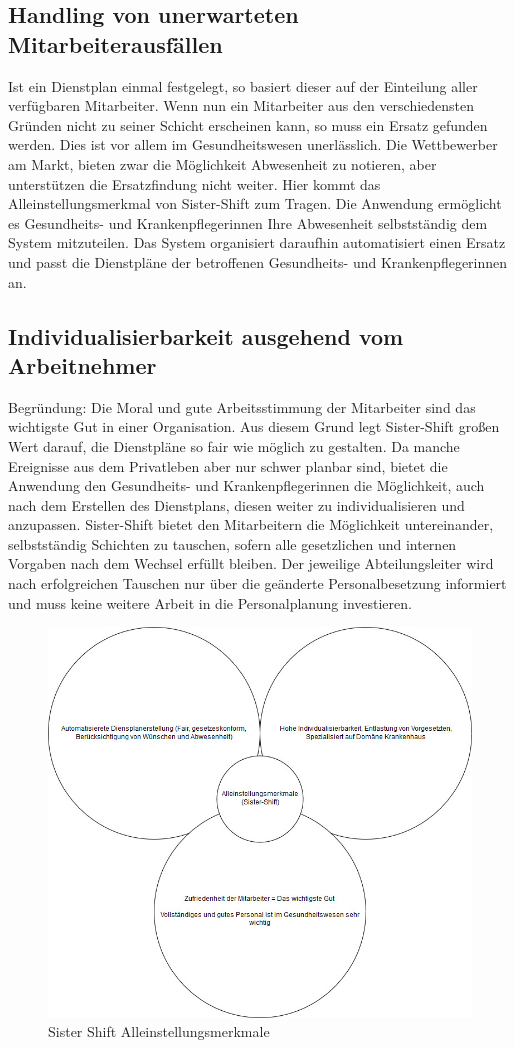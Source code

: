 \documentclass[10pt,a4paper]{article}
\begin{document}
\subsection{Handling von unerwarteten Mitarbeiterausfällen}
Ist ein Dienstplan einmal festgelegt, so basiert dieser auf der Einteilung aller verfügbaren Mitarbeiter. Wenn nun ein Mitarbeiter aus den verschiedensten Gründen nicht zu seiner Schicht erscheinen kann, so muss ein Ersatz gefunden werden. Dies ist vor allem im Gesundheitswesen unerlässlich. Die Wettbewerber am Markt, bieten zwar die Möglichkeit Abwesenheit zu notieren, aber unterstützen die Ersatzfindung nicht weiter. Hier kommt das Alleinstellungsmerkmal von Sister-Shift zum Tragen. Die Anwendung ermöglicht es Gesundheits- und Krankenpflegerinnen Ihre Abwesenheit selbstständig dem System mitzuteilen. Das System organisiert daraufhin automatisiert einen Ersatz und passt die Dienstpläne der betroffenen Gesundheits- und Krankenpflegerinnen an.
\subsection{Individualisierbarkeit ausgehend vom Arbeitnehmer}
Begründung: Die Moral und gute Arbeitsstimmung der Mitarbeiter sind das wichtigste Gut in einer Organisation. Aus diesem Grund legt Sister-Shift großen Wert darauf, die Dienstpläne so fair wie möglich zu gestalten. Da manche Ereignisse aus dem Privatleben aber nur schwer planbar sind, bietet die Anwendung den Gesundheits- und Krankenpflegerinnen die Möglichkeit, auch nach dem Erstellen des Dienstplans, diesen weiter zu individualisieren und anzupassen. Sister-Shift bietet den Mitarbeitern die Möglichkeit untereinander, selbstständig Schichten zu tauschen, sofern alle gesetzlichen und internen Vorgaben nach dem Wechsel erfüllt bleiben. Der jeweilige Abteilungsleiter wird nach erfolgreichen Tauschen nur über die geänderte Personalbesetzung informiert und muss keine weitere Arbeit in die Personalplanung investieren.
\begin{figure}[H]
\includegraphics[scale=0.45]{Bilder/USP.jpg}{\centering}
\caption{Sister Shift Alleinstellungsmerkmale}
\end{figure}
\end{document}
